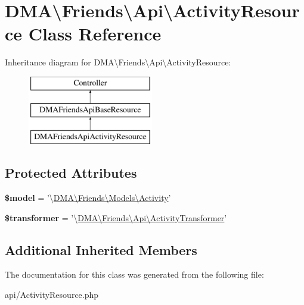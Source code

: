 \hypertarget{classDMA_1_1Friends_1_1Api_1_1ActivityResource}{\section{D\+M\+A\textbackslash{}Friends\textbackslash{}Api\textbackslash{}Activity\+Resource Class Reference}
\label{classDMA_1_1Friends_1_1Api_1_1ActivityResource}
}
Inheritance diagram for D\+M\+A\textbackslash{}Friends\textbackslash{}Api\textbackslash{}Activity\+Resource\+:\begin{figure}[H]
\begin{center}
\leavevmode
\includegraphics[height=3.000000cm]{d7/d53/classDMA_1_1Friends_1_1Api_1_1ActivityResource}
\end{center}
\end{figure}
\subsection*{Protected Attributes}
\begin{DoxyCompactItemize}
\item 
\hypertarget{classDMA_1_1Friends_1_1Api_1_1ActivityResource_a242d36374707954a784f08931e1796d9}{{\bfseries \$model} = '\textbackslash{}\hyperlink{classDMA_1_1Friends_1_1Models_1_1Activity}{D\+M\+A\textbackslash{}\+Friends\textbackslash{}\+Models\textbackslash{}\+Activity}'}\label{classDMA_1_1Friends_1_1Api_1_1ActivityResource_a242d36374707954a784f08931e1796d9}

\item 
\hypertarget{classDMA_1_1Friends_1_1Api_1_1ActivityResource_ab46a991a9e3980e6864c2c98c4fefe3a}{{\bfseries \$transformer} = '\textbackslash{}\hyperlink{classDMA_1_1Friends_1_1Api_1_1ActivityTransformer}{D\+M\+A\textbackslash{}\+Friends\textbackslash{}\+Api\textbackslash{}\+Activity\+Transformer}'}\label{classDMA_1_1Friends_1_1Api_1_1ActivityResource_ab46a991a9e3980e6864c2c98c4fefe3a}

\end{DoxyCompactItemize}
\subsection*{Additional Inherited Members}


The documentation for this class was generated from the following file\+:\begin{DoxyCompactItemize}
\item 
api/Activity\+Resource.\+php\end{DoxyCompactItemize}
